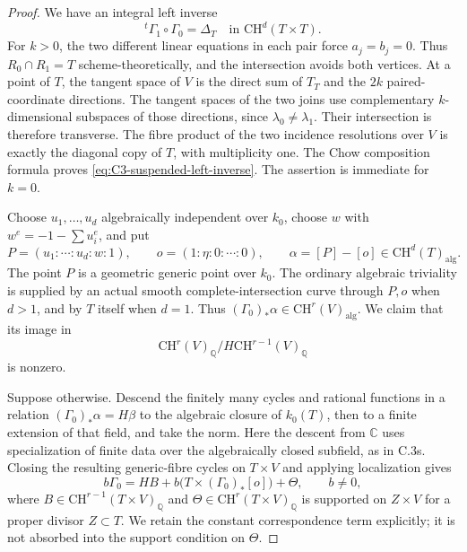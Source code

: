 \begin{proof}
We have an integral left inverse
\begin{equation}\label{eq:C3-suspended-left-inverse}
             {}^t\Gamma_1\circ\Gamma_0=\Delta_T
                         \quad\text{in }\mathrm{CH}^{d}(T\times T).
\end{equation}
For $k>0$, the two different linear equations in each pair
force $a_j=b_j=0$. Thus $R_0\cap R_1=T$ scheme-theoretically,
and the intersection avoids both vertices. At a point of
$T$, the tangent space of $V$ is the direct sum of $T_T$
and the $2k$ paired-coordinate directions. The tangent
spaces of the two joins use complementary $k$-dimensional
subspaces of those directions, since
$\lambda_0\ne\lambda_1$. Their intersection is therefore
transverse. The fibre product of the two incidence
resolutions over $V$ is exactly the diagonal copy of $T$,
with multiplicity one. The Chow composition formula proves
\eqref{eq:C3-suspended-left-inverse}. The assertion is immediate
for $k=0$.

Choose $u_1,\ldots,u_d$ algebraically independent over $k_0$,
choose $w$ with $w^e=-1-\sum u_i^e$, and put
\[
    P=(u_1:\cdots:u_d:w:1),\qquad
    o=(1:\eta:0:\cdots:0),\qquad
    \alpha=[P]-[o]\in\mathrm{CH}^{d}(T)_{\mathrm{alg}}.
\]
The point $P$ is a geometric generic point over $k_0$.
The ordinary algebraic triviality is supplied by an actual
smooth complete-intersection curve through $P,o$ when
$d>1$, and by $T$ itself when $d=1$. Thus
$(\Gamma_0)_*\alpha\in\mathrm{CH}^{r}(V)_{\mathrm{alg}}$.
We claim that its image in
\[
       \mathrm{CH}^{r}(V)_{\mathbb Q}/
                          H\mathrm{CH}^{r-1}(V)_{\mathbb Q}
\]
is nonzero.

Suppose otherwise. Descend the finitely many cycles and
rational functions in a relation
$(\Gamma_0)_*\alpha=H\beta$ to the algebraic closure of
$k_0(T)$, then to a finite extension of that field, and
take the norm. Here the descent from $\mathbb C$ uses
specialization of finite data over the algebraically closed
subfield, as in C.3s. Closing the resulting generic-fibre
cycles on $T\times V$ and applying localization gives
\begin{equation}\label{eq:C3-suspended-spread}
 b\Gamma_0
    =H B+b\bigl(T\times(\Gamma_0)_*[o]\bigr)+\Theta,
 \qquad b\ne0,
\end{equation}
where $B\in\mathrm{CH}^{r-1}(T\times V)_{\mathbb Q}$ and
$\Theta\in\mathrm{CH}^{r}(T\times V)_{\mathbb Q}$ is
supported on $Z\times V$ for a proper divisor $Z\subset T$.
We retain the constant correspondence term explicitly;
it is not absorbed into the support condition on $\Theta$.


\end{proof}
